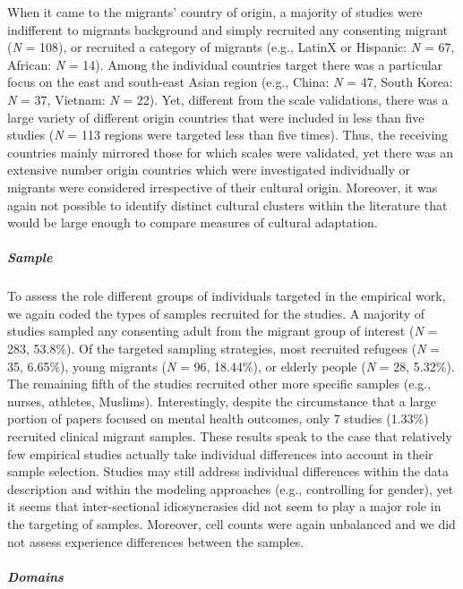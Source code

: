 When it came to the migrants' country of origin, a majority of studies
were indifferent to migrants background and simply recruited any
consenting migrant (\textit{N} = 108), or recruited a category of
migrants (e.g., LatinX or Hispanic: \textit{N} = 67, African: \textit{N}
= 14). Among the individual countries target there was a particular
focus on the east and south-east Asian region (e.g., China: \textit{N} =
47, South Korea: \textit{N} = 37, Vietnam: \textit{N} = 22). Yet,
different from the scale validations, there was a large variety of
different origin countries that were included in less than five studies
(\textit{N} = 113 regions were targeted less than five times). Thus, the
receiving countries mainly mirrored those for which scales were
validated, yet there was an extensive number origin countries which were
investigated individually or migrants were considered irrespective of
their cultural origin. Moreover, it was again not possible to identify
distinct cultural clusters within the literature that would be large
enough to compare measures of cultural adaptation.

\subparagraph{Sample}

To assess the role different groups of individuals targeted in the
empirical work, we again coded the types of samples recruited for the
studies. A majority of studies sampled any consenting adult from the
migrant group of interest (\textit{N} = 283, 53.8\%). Of the targeted
sampling strategies, most recruited refugees (\textit{N} = 35, 6.65\%),
young migrants (\textit{N} = 96, 18.44\%), or elderly people (\textit{N}
= 28, 5.32\%). The remaining fifth of the studies recruited other more
specific samples (e.g., nurses, athletes, Muslims). Interestingly,
despite the circumstance that a large portion of papers focused on
mental health outcomes, only 7 studies (1.33\%) recruited clinical
migrant samples. These results speak to the case that relatively few
empirical studies actually take individual differences into account in
their sample selection. Studies may still address individual differences
within the data description and within the modeling approaches (e.g.,
controlling for gender), yet it seems that inter-sectional
idiosyncrasies did not seem to play a major role in the targeting of
samples. Moreover, cell counts were again unbalanced and we did not
assess experience differences between the samples.

\subparagraph{Domains}


